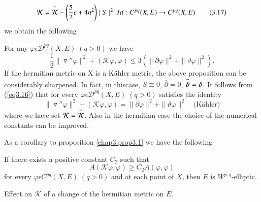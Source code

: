 \begin{equation*} 
  \mathcal{K}=\overset{\thicksim}{\mathcal{K}} - \left(\frac{5}{2} c +
  4n^2\right) \mid S 
  \mid^2. Id : C^{pq} (X,E)\rightarrow C^{pq}(X,E)  \tag{3.17}\label{eq3.17}
\end{equation*}
we obtain the following

\begin{prop}%
  For any $\varphi \epsilon \mathscr{D}^{pq} (X,E) \; (q>0)$ we have 
  $$
  \frac{1}{2}\|\triangledown''\varphi\|^2 +(\mathcal{K}\varphi,\varphi)\leq
  3 \left(\|\overline{\partial}\varphi\|^2 + \|\vartheta\varphi\|^2\right).
  $$
  If the hermitian metric on X is a K\"ahler metric, the above proposition
  can be considerably sharpened. In fact, 
  in this\pageoriginale case, $S \equiv 0$, $\overline{\partial}=\overline{0}$,
  $\overset{\thicksim}{\vartheta}=\vartheta$. It follows from (\ref{eq3.16}) 
  that for every $\varphi \epsilon \mathscr{D}^{pq}(X,E) \; (q>0)$
  satisfies the identity 
  \begin{equation*}
    \|\triangledown'' \varphi\|^2 + (\mathcal{K}\varphi,\varphi)=
    \|\overline{\partial}\varphi\|^2 + \|\vartheta \varphi\|^2 \quad
    \text{(K\"ahler)}  \tag{3.18}\label{eq3.18}
  \end{equation*} 
  where we have set
  $\mathcal{K}=\overset{\thicksim}{\mathcal{K}}$. Also in the
  hermitian case the choice of the numerical constants can be
  improved.   
\end{prop}

As a corollary to proposition \ref{chap3:prop3.1} we have the following 

\begin{theorem}%
  If there exists a positive constant $C_2$ such that 
  $$
  A(\mathcal{K} \varphi,\varphi)\geq C_2 A(\varphi,\varphi)
  $$
  for every $\varphi \epsilon C^{pq}(X,E) \; (q>0)$ and at each point of
  $X$, then $E$ is $W^{p,q}$-elliptic. 
\end{theorem}

\begin{remark*}
  Effect on $\mathcal{K}$ of a change of the hermitian metric on $E$.
\end{remark*}

